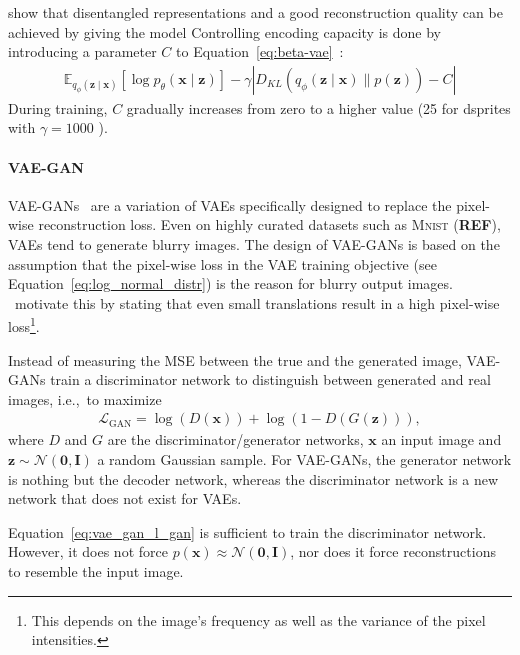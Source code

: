 \citet{burgess2018understanding} show that disentangled representations and a good reconstruction quality can be achieved by giving the model 
Controlling encoding capacity is done by introducing a parameter $C$ to Equation~\ref{eq:beta-vae}~\citep{burgess2018understanding}:
\begin{align}
    \mathbb{E}_{q_{\phi}(\mathbf{z} \mid \bm{x})}\left[\log p_{\theta}(\bm{x} \mid \bm{z})\right]-\gamma\left|D_{K L}\left(q_{\phi}(\bm{z} \mid \bm{x}) \| p(\bm{z})\right)-C\right|
\end{align}
During training, $C$ gradually increases from zero to a higher value (25 for dsprites with $\gamma=1000$ \citep{burgess2018understanding}).

\paragraph{\ac{VAE}-\ac{GAN}}
\ac{VAE}-\acp{GAN}~\citep{larsen2015autoencoding} are a variation of \acp{VAE} specifically designed to replace the pixel-wise reconstruction loss.
Even on highly curated datasets such as \textsc{Mnist} (\textbf{REF}), \acp{VAE} tend to generate blurry images.
The design of \ac{VAE}-\acp{GAN} is based on the assumption that the pixel-wise loss in the \ac{VAE} training objective (see Equation~\ref{eq:log_normal_distr}) is the reason for blurry output images.
\citet{larsen2015autoencoding}~motivate this by stating that even small translations result in a high pixel-wise loss\footnote{This depends on the image's frequency as well as the variance of the pixel intensities.}.

Instead of measuring the \ac{MSE} between the true and the generated image, \ac{VAE}-\acp{GAN} train a discriminator network to distinguish between generated and real images, i.e.,~to maximize
\begin{align}
    \mathcal{L}_{\mathrm{GAN}}=\log (D(\bm{x}))+\log (1-D(G(\bm{z}))), \label{eq:vae_gan_l_gan}
\end{align}
where $D$ and $G$ are the discriminator/generator networks, $\bm{x}$ an input image and $\bm{z}\sim \mathcal{N}(\bm{0},\bm{I})$ a random Gaussian sample.
For \ac{VAE}-\acp{GAN}, the generator network is nothing but the decoder network, whereas the discriminator network is a new network that does not exist for \acp{VAE}.

Equation~\ref{eq:vae_gan_l_gan} is sufficient to train the discriminator network.
However, it does not force $p(\bm{x}) \approx \mathcal{N}(\bm{0},\bm{I})$, nor does it force reconstructions to resemble the input image.

